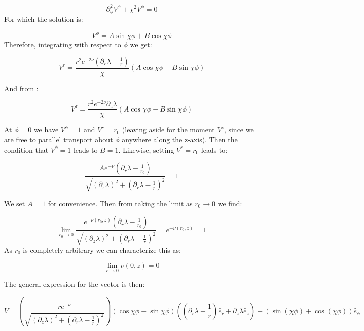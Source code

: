 \documentclass{article}
\begin{document}
\begin{equation}
\partial^2_\phi V^\phi+\chi^2 V^\phi=0
\end{equation}
For which the solution is:

\begin{equation}
V^{\phi}=A\sin\chi\phi+B\cos\chi\phi
\end{equation}
Therefore, integrating  with respect to $\phi$ we get:

\begin{equation}
V^{r}=\frac{r^2e^{-2\nu}(\partial_r\lambda-\frac{1}{r})}{\chi}\left(A\cos\chi\phi-B\sin\chi\phi\right)
\end{equation}

And from :

\begin{equation}
V^{z}=\frac{r^2 e^{-2\nu}\partial_z\lambda}{\chi}\left(A\cos\chi\phi-B\sin\chi\phi\right)
\end{equation}

At $\phi=0$ we have $V^\phi=1$ and $V^r=r_0$ (leaving aside for the
moment $V^z$, since we are free to parallel transport about $\phi$
anywhere along the z-axis). Then the condition that $V^\phi=1$ leads to
$B=1$. Likewise, setting $V^r=r_0$ leads to:

\begin{equation}
  \label{eq:conditions}
  \frac{A e^{-\nu}(\partial_r\lambda-\frac{1}{r_0})}{\sqrt{\left(\partial_z\lambda\right)^2+\left(\partial_r\lambda-\frac{1}{r}\right)^2}}=1
\end{equation}

We set $A=1$ for convenience. Then from  taking
the limit as $r_0\rightarrow 0$ we find:

\begin{equation}
  \label{eq:limit-r->0}
  \lim_{r_0\rightarrow 0} \frac{e^{-\nu(r_0,z)}(\partial_r\lambda-\frac{1}{r_0})}{\sqrt{\left(\partial_z\lambda\right)^2+\left(\partial_r\lambda-\frac{1}{r}\right)^2}}=e^{-\nu(r_0,z)}=1
\end{equation}
As $r_0$ is completely arbitrary we can characterize this as:

\begin{equation}
  \label{eq:nu-elem-flat}
  \lim_{r\rightarrow 0}\nu(0,z)=0
\end{equation}

The general expression for the vector is then:

\begin{equation}
\label{eq:v-from-par-transport}
V=\left(\frac{r e^{-\nu}}{\sqrt{\left(\partial_z\lambda\right)^2+\left(\partial_r\lambda-\frac{1}{r}\right)^2}}\right)\left(\cos\chi\phi-\sin\chi\phi\right)\left(\left(\partial_r\lambda-\frac{1}{r}\right)\hat{e}_{r}+\partial_z\lambda\hat{e}_{z}\right)+\left(\sin(\chi\phi)+\cos(\chi\phi)\right)\hat{e}_{\phi}
\end{equation}
\end{document}

